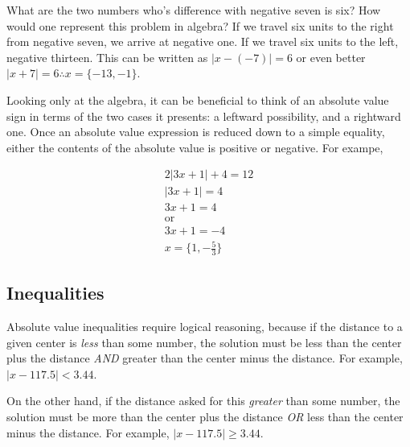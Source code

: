 \begin{example}
	\exProblem
What are the two numbers who's difference with negative seven is six?  How would one
represent this problem in algebra?
	\exSolution
If we travel six units to the right from negative seven, we arrive at negative one.  If we travel
six units to the left, negative thirteen.  This can be written as $|x-(-7)|=6$ or even better
$|x+7|=6 \therefore x=\{-13,-1\}$.
\end{example}

Looking only at the algebra, it can be beneficial to think of an absolute value sign in terms 
of the two cases it presents: a leftward possibility, and a rightward one.
Once an absolute value expression is reduced down to a simple equality, either the contents
of the absolute value is positive or negative.  For exampe, 

\begin{align*}
2|3x+1|+4=12\\
|3x+1|=4\\
3x+1=4 \\
\text{or}\\
3x+1=-4\\
x=\{1, -\frac{5}{3}\}
\end{align*}


\subsection{Inequalities}
Absolute value inequalities require logical reasoning, because if the distance to a given center
is \emph{less} than some number, the solution must be less than the center plus the distance
\emph{AND}  greater than the center minus the distance.  For example, $|x-117.5|<3.44$.


On the other hand, if the distance asked for this \emph{greater} than some number, the solution
must be more than the center plus the distance \emph{OR} less than the center minus the 
distance.  For example, $|x-117.5|\ge3.44$.

